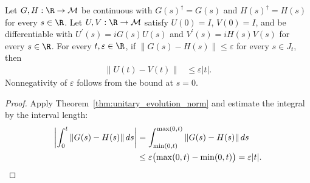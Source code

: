 \begin{theorem}
    \label{thm:unitary_evolution_error}
    \leanok
    Let $G,H:\R\to\mathcal M$ be continuous with
    $G(s)^\dagger=G(s)$ and $H(s)^\dagger=H(s)$ for every $s\in\R$.
    Let $U,V:\R\to\mathcal M$ satisfy $U(0)=I$, $V(0)=I$, and
    be differentiable with $U^{\prime}(s)=iG(s)U(s)$ and
    $V^{\prime}(s)=iH(s)V(s)$ for every $s\in\R$.
    For every $t,\varepsilon\in\R$, if
    $\|G(s)-H(s)\|\le\varepsilon$ for every $s\in J_t$, then
    \begin{align}
        \|U(t)-V(t)\|&\le\varepsilon|t|.
        \label{eq:unitary_evolution_error}
    \end{align}
    Nonnegativity of $\varepsilon$ follows from the bound at $s=0$.
\end{theorem}
\begin{proof}\leanok
    Apply Theorem~\ref{thm:unitary_evolution_norm} and estimate the
    integral by the interval length:
    \begin{align}
        \left|\int_0^t\|G(s)-H(s)\|\,ds\right|
            &=\int_{\min(0,t)}^{\max(0,t)}\|G(s)-H(s)\|\,ds\notag\\
            &\le\varepsilon\bigl(\max(0,t)-\min(0,t)\bigr)
             =\varepsilon|t|.\notag
    \end{align}
\end{proof}


